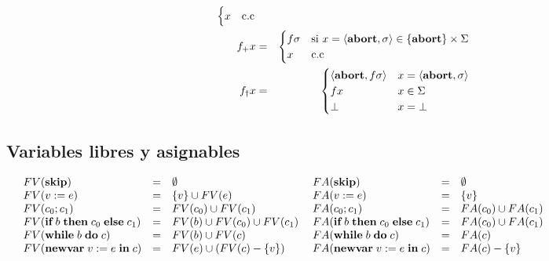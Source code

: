 \begin{multicols}{2}
\begin{eqnarray*}
\begin{cases}
                        x & \text{c.c}
                      \end{cases} \\
        f_{+} x &=& \begin{cases}
                      f \sigma & \text{si } x = \langle\textbf{abort}, \sigma\rangle \in \{\textbf{abort}\} \times \Sigma\\
                      x & \text{c.c}
                    \end{cases} \\
        f_{\dag} x &=& \begin{cases}
                        \langle\textbf{abort}, f \sigma\rangle & x = \langle\textbf{abort}, \sigma\rangle \\
                        f x & x \in \Sigma \\
                        \bot & x = \bot
                      \end{cases} \\
      \end{eqnarray*}
    \end{multicols}

  \subsection*{Variables libres y asignables}
    $\begin{array}{lllllll}
      & FV(\textbf{skip}) &=& \emptyset  &\; FA(\textbf{skip}) &=& \emptyset \\
      & FV(v:=e) &=& \{v\} \cup FV(e)  &\; FA(v:=e) &=& \{v\} \\
      & FV(c_{0};c_1) &=& FV(c_0) \cup FV(c_{1})  &\; FA(c_0;c_1) &=& FA(c_0) \cup FA(c_1) \\
      & FV(\textbf{if}\;b\;\textbf{then}\;c_0\;\textbf{else}\;c_1) &=& FV(b) \cup FV(c_0) \cup FV(c_1)  &\; FA(\textbf{if}\;b\;\textbf{then}\;c_0\;\textbf{else}\;c_1) &=& FA(c_0) \cup FA(c_1)\\
      & FV(\textbf{while}\;b\;\textbf{do}\;c) &=& FV(b) \cup FV(c) &\; FA(\textbf{while}\;b\;\textbf{do}\;c) &=& FA(c) \\
      & FV(\textbf{newvar}\;v:=e\;\textbf{in}\;c) &=& FV(e) \cup (FV(c) - \{v\})  &\; FA(\textbf{newvar}\;v:=e\;\textbf{in}\;c) &=& FA(c) - \{v\} \\
    \end{array}$

